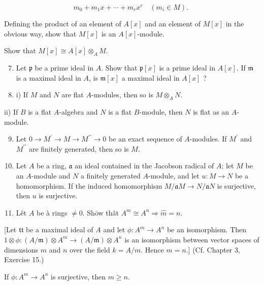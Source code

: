 \documentclass{standalone}
\theoremstyle{definition}
\theoremstyle{remark}
\begin{document}
\[
m_{0}+m_{1} x+\cdots+m_{r} x^{r} \quad\left(m_{i} \in M\right) \text {. }
\]

Defining the product of an element of $A[x]$ and an element of $M[x]$ in the obvious way, show that $M[x]$ is an $A[x]$-module.

Show that $M[x] \cong A[x] \otimes_{A} M$.

\begin{enumerate}
  \setcounter{enumi}{6}
  \item Let $\mathfrak{p}$ be a prime ideal in $A$. Show that $\mathfrak{p}[x]$ is a prime ideal in $A[x]$. If $\mathfrak{m}$ is a maximal ideal in $A$, is $\mathfrak{m}[x]$ a maximal ideal in $A[x]$ ?

  \item i) If $M$ and $N$ are flat $A$-modules, then so is $M \otimes_{A} N$.

\end{enumerate}

ii) If $B$ is a flat $A$-algebra and $N$ is a flat $B$-module, then $N$ is flat as an $A$-module.

\begin{enumerate}
  \setcounter{enumi}{8}
  \item Let $0 \rightarrow M^{\prime} \rightarrow M \rightarrow M^{\prime \prime} \rightarrow 0$ be an exact sequence of $A$-modules. If $M^{\prime}$ and $M^{\prime \prime}$ are finitely generated, then so is $M$.

  \item Let $A$ be a ring, $\mathfrak{a}$ an ideal contained in the Jacobson radical of $A$; let $M$ be an $A$-module and $N$ a finitely generated $A$-module, and let $u: M \rightarrow N$ be a homomorphism. If the induced homomorphism $M / \mathfrak{a} M \rightarrow N / \mathfrak{a} N$ is surjective, then $u$ is surjective.

  \item Lêt $A$ be à rings $\neq 0$. Shōw thât $A^{m} \cong A^{n} \Rightarrow \hat{m}=n$.

\end{enumerate}

[Let $\mathfrak{t t}$ be a maximal ideal of $A$ and let $\phi: A^{m} \rightarrow A^{n}$ be an isomorphism. Then $1 \otimes \phi:(A / \mathfrak{m}) \otimes A^{m} \rightarrow(A / \mathfrak{m}) \otimes A^{n}$ is an isomorphism between vector spaces of dimensions $m$ and $n$ over the field $k=A / m$. Hence $m=n$.] (Cf. Chapter 3, Exercise 15.)

If $\phi: A^{m} \rightarrow A^{n}$ is surjective, then $m \geqslant n$.
\end{document}
